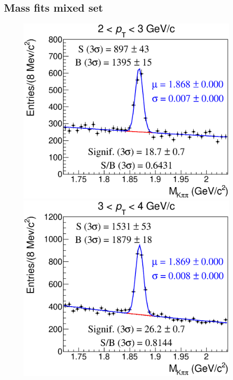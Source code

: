 \documentclass[b5paper,10pt,twoside,oldstyle,classica]{toptesi}
\begin{document}
\subsection{Mass fits mixed set}
\begin{figure}[h]
\begin{center}
{\includegraphics[scale = 0.25]{MassFitSet2_Pt0.eps}}
\hspace{0cm}
{\includegraphics[scale = 0.25]{MassFitSet2_Pt1.eps}}
\vspace{0cm}

\end{center}
\end{figure}
\end{document}
